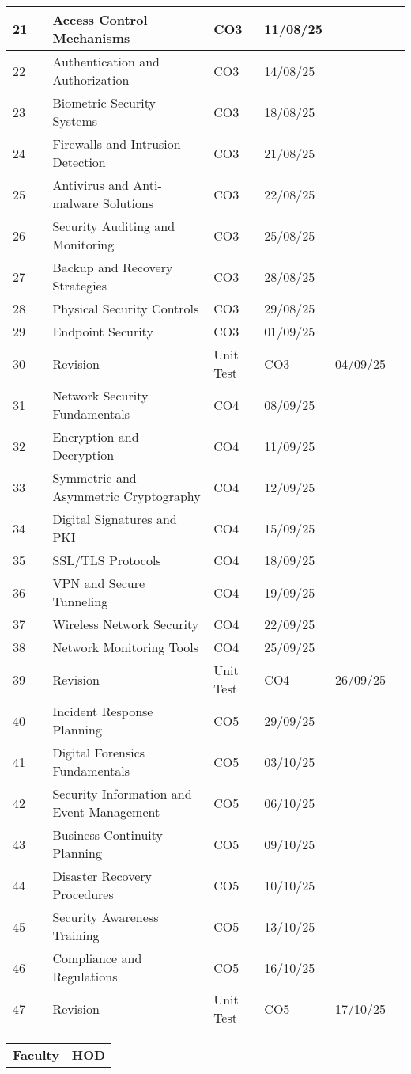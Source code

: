 \documentclass[12pt]{article}
\begin{document}
\begin{longtable}{|p{1cm}|p{3.5cm}|p{6cm}|p{1cm}|p{2cm}|p{2cm}|p{2cm}|}
21 &  & Access Control Mechanisms & CO3 & 11/08/25 &  &  \\\hline
22 &  & Authentication and Authorization & CO3 & 14/08/25 &  &  \\\hline
23 &  & Biometric Security Systems & CO3 & 18/08/25 &  &  \\\hline
24 &  & Firewalls and Intrusion Detection & CO3 & 21/08/25 &  &  \\\hline
25 &  & Antivirus and Anti-malware Solutions & CO3 & 22/08/25 &  &  \\\hline
26 &  & Security Auditing and Monitoring & CO3 & 25/08/25 &  &  \\\hline
27 &  & Backup and Recovery Strategies & CO3 & 28/08/25 &  &  \\\hline
28 &  & Physical Security Controls & CO3 & 29/08/25 &  &  \\\hline
29 &  & Endpoint Security & CO3 & 01/09/25 &  &  \\\hline
30 &  & Revision & Unit Test & CO3 & 04/09/25 &  &  \\\hline
31 &  & Network Security Fundamentals & CO4 & 08/09/25 &  &  \\\hline
32 &  & Encryption and Decryption & CO4 & 11/09/25 &  &  \\\hline
33 &  & Symmetric and Asymmetric Cryptography & CO4 & 12/09/25 &  &  \\\hline
34 &  & Digital Signatures and PKI & CO4 & 15/09/25 &  &  \\\hline
35 &  & SSL/TLS Protocols & CO4 & 18/09/25 &  &  \\\hline
36 &  & VPN and Secure Tunneling & CO4 & 19/09/25 &  &  \\\hline
37 &  & Wireless Network Security & CO4 & 22/09/25 &  &  \\\hline
38 &  & Network Monitoring Tools & CO4 & 25/09/25 &  &  \\\hline
39 &  & Revision & Unit Test & CO4 & 26/09/25 &  &  \\\hline
40 &  & Incident Response Planning & CO5 & 29/09/25 &  &  \\\hline
41 &  & Digital Forensics Fundamentals & CO5 & 03/10/25 &  &  \\\hline
42 &  & Security Information and Event Management & CO5 & 06/10/25 &  &  \\\hline
43 &  & Business Continuity Planning & CO5 & 09/10/25 &  &  \\\hline
44 &  & Disaster Recovery Procedures & CO5 & 10/10/25 &  &  \\\hline
45 &  & Security Awareness Training & CO5 & 13/10/25 &  &  \\\hline
46 &  & Compliance and Regulations & CO5 & 16/10/25 &  &  \\\hline
47 &  & Revision & Unit Test & CO5 & 17/10/25 &  &  \\\hline
\end{longtable}

\vspace{1cm}

\begin{tabular}{p{8cm}p{8cm}}
\textbf{Faculty} & \textbf{HOD} \\
\end{tabular}
\end{document}
